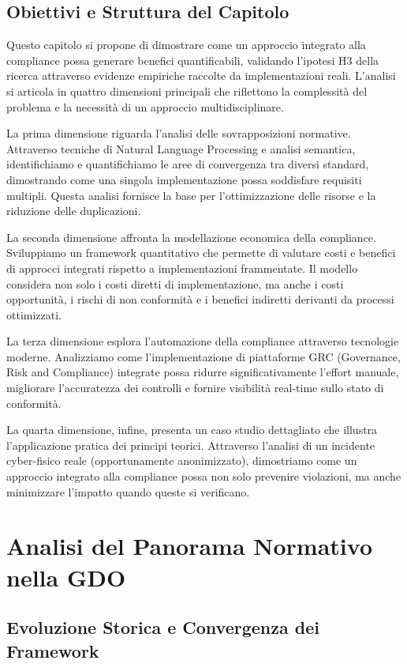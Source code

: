 \subsection{Obiettivi e Struttura del Capitolo}

Questo capitolo si propone di dimostrare come un approccio integrato alla compliance possa generare benefici quantificabili, validando l'ipotesi H3 della ricerca attraverso evidenze empiriche raccolte da implementazioni reali. L'analisi si articola in quattro dimensioni principali che riflettono la complessità del problema e la necessità di un approccio multidisciplinare.

La prima dimensione riguarda l'analisi delle sovrapposizioni normative. Attraverso tecniche di Natural Language Processing e analisi semantica, identifichiamo e quantifichiamo le aree di convergenza tra diversi standard, dimostrando come una singola implementazione possa soddisfare requisiti multipli. Questa analisi fornisce la base per l'ottimizzazione delle risorse e la riduzione delle duplicazioni.

La seconda dimensione affronta la modellazione economica della compliance. Sviluppiamo un framework quantitativo che permette di valutare costi e benefici di approcci integrati rispetto a implementazioni frammentate. Il modello considera non solo i costi diretti di implementazione, ma anche i costi opportunità, i rischi di non conformità e i benefici indiretti derivanti da processi ottimizzati.

La terza dimensione esplora l'automazione della compliance attraverso tecnologie moderne. Analizziamo come l'implementazione di piattaforme GRC (Governance, Risk and Compliance) integrate possa ridurre significativamente l'effort manuale, migliorare l'accuratezza dei controlli e fornire visibilità real-time sullo stato di conformità.

La quarta dimensione, infine, presenta un caso studio dettagliato che illustra l'applicazione pratica dei principi teorici. Attraverso l'analisi di un incidente cyber-fisico reale (opportunamente anonimizzato), dimostriamo come un approccio integrato alla compliance possa non solo prevenire violazioni, ma anche minimizzare l'impatto quando queste si verificano.

\section{Analisi del Panorama Normativo nella GDO}

\subsection{Evoluzione Storica e Convergenza dei Framework}

